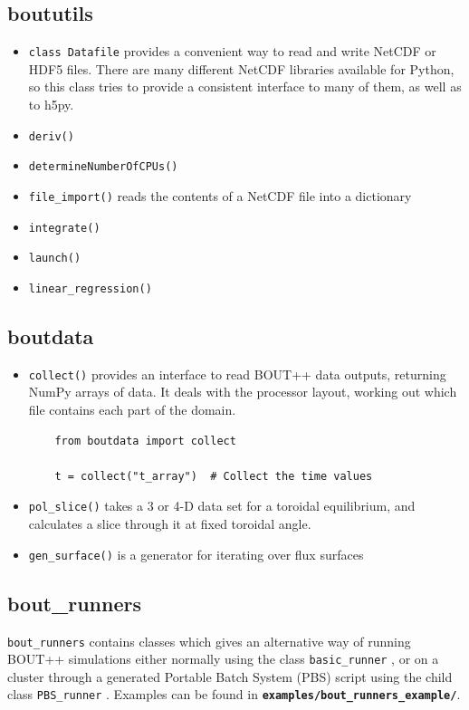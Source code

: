 \documentclass[12pt]{article}
\newcommand{\file}[1]{\texttt{\bf #1}}
\begin{document}
\subsection{boututils}
%
\begin{itemize}
\item
%
\lstinline!class Datafile!
%
 provides a convenient way to read and write NetCDF or HDF5 files. There are
 many different NetCDF libraries available for Python, so this class tries to
 provide a consistent interface to many of them, as well as to h5py.
\item
%
\lstinline!deriv()!
%
\item
%
\lstinline!determineNumberOfCPUs()!
%
\item
%
\lstinline!file_import()!
%
 reads the contents of a NetCDF file into a dictionary
\item
%
\lstinline!integrate()!
%
\item
%
\lstinline!launch()!
%
\item
%
\lstinline!linear_regression()!
%
\end{itemize}
%



\subsection{boutdata}
%
\begin{itemize}
\item
%
\lstinline!collect()!
%
 provides an interface to read BOUT++ data outputs, returning NumPy arrays of data.
  It deals with the processor layout, working out which file contains each part of the domain.
  \begin{lstlisting}
    from boutdata import collect

    t = collect("t_array")  # Collect the time values
  \end{lstlisting}
%
\item
%
\lstinline!pol_slice()!
%
 takes a 3 or 4-D data set for a toroidal equilibrium, and calculates a slice
  through it at fixed toroidal angle.
\item
%
\lstinline!gen_surface()!
%
 is a generator for iterating over flux surfaces
\end{itemize}
%



\subsection{bout\_runners}
%
\label{sec:bout_runners}
%
\lstinline!bout_runners!
%
contains classes which gives an alternative way of running BOUT++ simulations
either normally using the class
%
\lstinline!basic_runner!
%
, or on a cluster through a generated Portable Batch System
(PBS) script using the child class
%
\lstinline!PBS_runner!
%
. Examples can be found in \file{examples/bout\_runners\_example/}.
\end{document}
